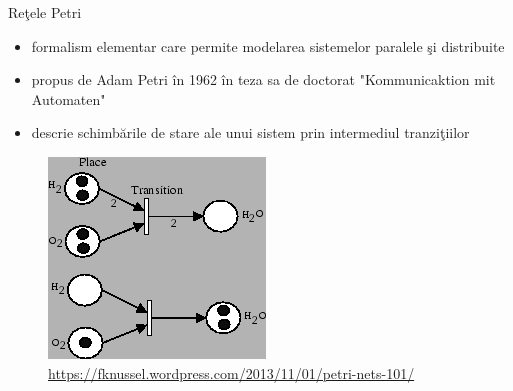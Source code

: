 \documentclass{beamer}
\begin{document}
\begin{frame}{Reţele Petri}
\begin{itemize}
\item
formalism elementar care permite modelarea sistemelor paralele şi distribuite
\item
propus de Adam Petri în 1962 în teza sa de doctorat "Kommunicaktion mit Automaten"
\item
descrie schimbările de stare ale unui sistem prin intermediul tranziţiilor
\end{itemize}

\vspace{0.5cm}

\begin{figure}
\includegraphics[scale=0.4]{images/pn_water}
\caption{\label{fig:pn_water}\url{https://fknussel.wordpress.com/2013/11/01/petri-nets-101/}}
\end{figure}

\end{frame}
\end{document}
